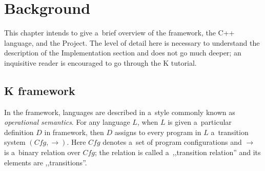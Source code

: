 \documentclass{fithesis3}
\newcommand{\var}[1]{\mathit{#1}\xspace}
\newcommand{\Project}{Project\xspace}
\begin{document}



\chapter{Background}
This chapter intends to give a~brief overview of the \K framework, the C++ language, and the \Project.
The level of detail here is necessary to understand the description of the Implementation section and does not go much deeper; an inquisitive reader is encouraged to go through the K tutorial. %

\section{K framework}

%





In the \K framework, languages are described in a~style commonly known as \textit{operational semantics}. For any language $\var{L}$, when $\var{L}$ is given a~particular definition $\var{D}$ in \K framework, then $\var{D}$ assigns to every program in $\var{L}$ a~transition system $( \var{Cfg}, \rightarrow )$. Here $\var{Cfg}$ denotes a~set of program configurations and $\rightarrow$ is a~binary relation over $\var{Cfg}$; the relation is called a~,,transition relation'' and its elements are ,,transitions''. %
\end{document}
